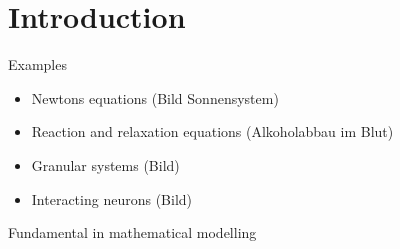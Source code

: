 \section{Introduction}



\begin{frame}
 


\vspace{4ex}

Examples

\begin{itemize}
 \item Newtons equations (Bild Sonnensystem)
 \item Reaction and relaxation equations (Alkoholabbau im Blut)
 \item Granular systems (Bild)
 \item Interacting neurons (Bild)
\end{itemize}

Fundamental in mathematical modelling
 

\end{frame}


